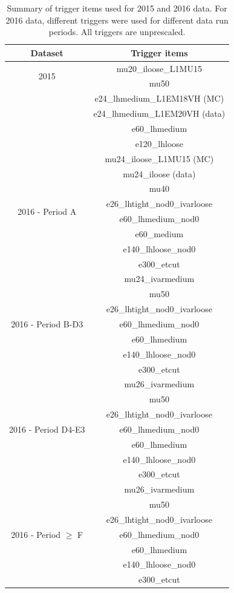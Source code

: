 \begin{table}[htbp!]
\begin{center}
 \begin{tabular}{|c|c|}
  \hline
  Dataset & Trigger items \\
  \hline
  \multirow{2}{*}{2015} & mu20\_iloose\_L1MU15  \\
    & mu50  \\
    & e24\_lhmedium\_L1EM18VH (MC)  \\
    & e24\_lhmedium\_L1EM20VH (data)  \\
    & e60\_lhmedium  \\
    & e120\_lhloose  \\
  \hline
  \multirow{8}{*}{2016 - Period A} & mu24\_iloose\_L1MU15 (MC)  \\
    & mu24\_iloose (data)  \\
    & mu40  \\
    & e26\_lhtight\_nod0\_ivarloose  \\
    & e60\_lhmedium\_nod0  \\
    & e60\_medium  \\
    & e140\_lhloose\_nod0  \\
    & e300\_etcut  \\
  \hline
  \multirow{7}{*}{2016 - Period B-D3} & mu24\_ivarmedium  \\
    & mu50  \\
    & e26\_lhtight\_nod0\_ivarloose  \\
    & e60\_lhmedium\_nod0  \\
    & e60\_lhmedium  \\
    & e140\_lhloose\_nod0  \\
    & e300\_etcut  \\
  \hline
  \multirow{7}{*}{2016 - Period D4-E3} & mu26\_ivarmedium  \\
   & mu50  \\
   & e26\_lhtight\_nod0\_ivarloose  \\
   & e60\_lhmedium\_nod0  \\
   & e60\_lhmedium \\
   & e140\_lhloose\_nod0  \\
   & e300\_etcut  \\
  \hline
  \multirow{7}{*}{2016 - Period $\ge$ F} & mu26\_ivarmedium   \\
   & mu50  \\
   & e26\_lhtight\_nod0\_ivarloose  \\
   & e60\_lhmedium\_nod0  \\
   & e60\_lhmedium  \\
   & e140\_lhloose\_nod0  \\
   & e300\_etcut  \\
  \hline
 \end{tabular}
\end{center}
\caption{Summary of trigger items used for 2015 and 2016 data. For 2016 data, different triggers were used for different data run periods. 
All triggers are unprescaled.}
\label{tab:triggers}
\end{table}


